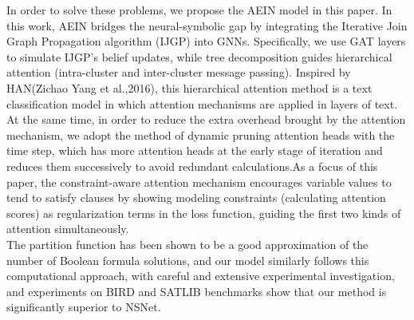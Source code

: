 In order to solve these problems, we propose the AEIN model in this paper. In this work, AEIN bridges the neural-symbolic 
gap by integrating the Iterative Join Graph Propagation  algorithm (IJGP)\cite{A15} into GNNs.   Specifically, we use GAT 
layers to simulate IJGP's belief updates, while tree decomposition guides hierarchical attention (intra-cluster and 
inter-cluster message passing). Inspired by HAN(Zichao Yang et al.,2016)\cite{B5}, this hierarchical attention method 
is a text classification model in which attention mechanisms are applied in layers of text. At the same time, in order 
to reduce the extra overhead brought by the attention mechanism, we adopt the method of dynamic pruning attention heads 
with the time step\cite{B6}\cite{A16}, which has more attention heads at the early stage of iteration and reduces them 
successively to avoid redundant calculations.As a focus of this paper, the constraint-aware attention mechanism encourages 
variable values to tend to satisfy clauses by showing modeling constraints (calculating attention scores) as regularization 
terms in the loss function, guiding the first two kinds of attention simultaneously. \\

The partition function has been shown to be a good approximation of the number of Boolean formula solutions\cite{A17}\cite{A18}, 
and our model similarly follows this computational approach, with careful and extensive experimental investigation, and 
experiments on BIRD and SATLIB benchmarks show that our method is significantly superior to NSNet. 
